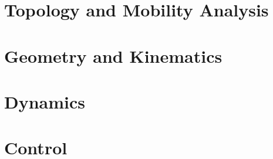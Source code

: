 \documentclass{scrreprt}
\subtitle{Coursework}
\begin{document}
\maketitle

\tableofcontents 

\cleardoublepage

\pagestyle{plain}


\chapter{Topology and Mobility Analysis}



\chapter{Geometry and Kinematics}

\chapter{Dynamics}
\chapter{Control}


%

\end{document}
